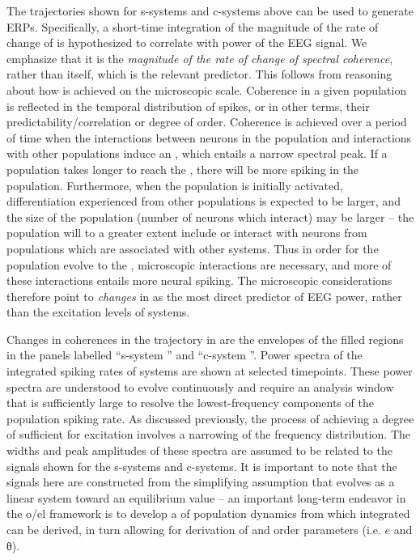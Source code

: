   The  trajectories shown for s-sys\-tems and c-sys\-tems above can be used to generate ERPs. Specifically, a short-time integration of the magnitude of the rate of change of  is hypothesized to correlate with power of the EEG signal. We emphasize that it is the \textit{magnitude of the rate of change of spectral coherence}, rather than  itself, which is the relevant predictor. This follows from reasoning about how  is achieved on the microscopic scale. Coherence in a given population is reflected in the temporal distribution of spikes, or in other terms, their predictability/correlation or degree of order. Coherence is achieved over a period of time when the interactions between neurons in the population and interactions with other populations induce an , which entails a narrow spectral peak. If a population takes longer to reach the , there will be more spiking in the population. Furthermore, when the population is initially activated, differentiation  experienced from other populations is expected to be larger, and the size of the population (number of neurons which interact) may be larger -- the population will to a greater extent include or interact with neurons from populations which are associated with other systems. Thus in order for the population evolve to the , microscopic interactions are necessary, and more of these interactions entails more neural spiking. The microscopic considerations therefore point to \textit{changes} in  as the most direct predictor of EEG power, rather than the excitation levels of systems. 

Changes in coherences in the trajectory in {} are the envelopes of the filled regions in the panels labelled “s-sys\-tem ” and “c-sys\-tem ”. Power spectra of the integrated spiking rates of systems are shown at selected timepoints. These power spectra are understood to evolve continuously and require an analysis window that is sufficiently large to resolve the lowest-frequency components of the population spiking rate. As discussed previously, the process of achieving a degree of  sufficient for excitation involves a narrowing of the frequency distribution. The widths and peak amplitudes of these spectra are assumed to be related to the  signals shown for the s-sys\-tems and c-sys\-tems. It is important to note that the  signals here are constructed from the simplifying assumption that  evolves as a linear system toward an equilibrium value -- an important long-term endeavor in the o/el framework is to develop a  of population dynamics from which integrated  can be derived, in turn allowing for derivation of  and order parameters (i.e. $e$ and θ). 


